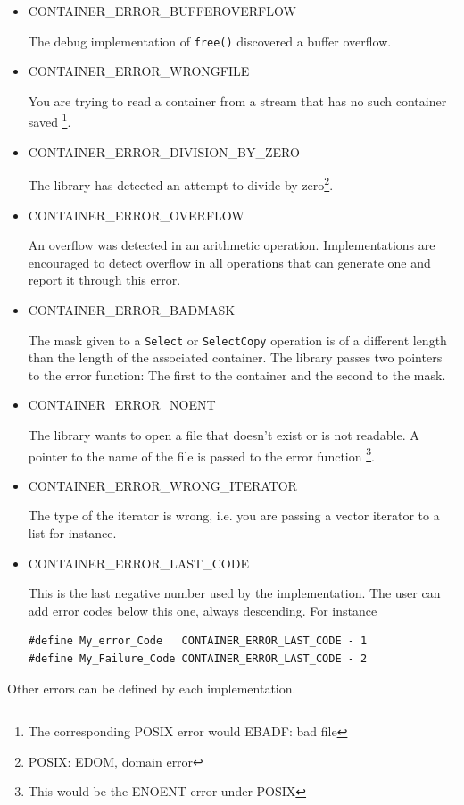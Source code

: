 \documentclass[12pt,a4paper]{memoir} %
\newif\iftth
\newcommand{\doerror}[1]{%
\par\noindent
\iftth
{CONTAINER\_ERROR\_#1}
\else
{\footnotesize CONTAINER\_ERROR\_#1}
\fi
}
\begin{document}
\begin{itemize}
\doerror{BADPOINTER} The debug implementation of \texttt{free()} has discovered an incorrect pointer attempting to be freed\footnote{In POSIX this would be EFAULT.}.
\item
\doerror{BUFFEROVERFLOW} The debug implementation of \texttt{free()} discovered a buffer overflow.
\item
\doerror{WRONGFILE} You are trying to read a container from a stream that has no such container saved
\footnote{The corresponding POSIX error would EBADF: bad file}.
\item 
\doerror{DIVISION\_BY\_ZERO} The library has detected an attempt to divide by zero\footnote{POSIX: EDOM, domain error}.
\item
\doerror{OVERFLOW} An overflow was detected in an arithmetic operation. Implementations are encouraged to detect overflow in all operations that
can generate one and report it through this error.
\item
\doerror{BADMASK} The mask given to a \verb,Select, or \verb,SelectCopy, operation is of a different length than the length of the associated
container. The library passes two pointers to the error function: The first to the container and the second to the mask.
\item
\doerror{NOENT} The library wants to open a file that doesn't exist or is not readable. A pointer to the name of the file is passed to the error function
\footnote{This would be the ENOENT error under POSIX}.
\item
\doerror{WRONG\_ITERATOR} The type of the iterator is wrong, i.e. you are passing a vector iterator to a list for instance.
\item
\doerror{LAST\_CODE} This is the last negative number used by the implementation. The user can add error codes below this one, always descending.
For instance
\begin{verbatim}
#define My_error_Code   CONTAINER_ERROR_LAST_CODE - 1
#define My_Failure_Code CONTAINER_ERROR_LAST_CODE - 2
\end{verbatim}
\end{itemize}


Other errors can be defined by each implementation.
\end{document}
